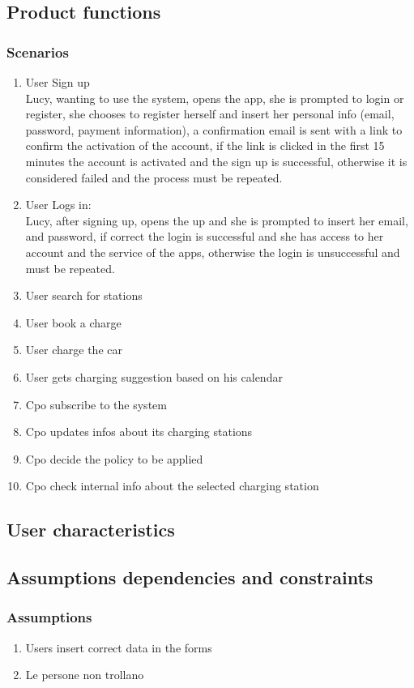\subsection{Product functions}

\subsubsection{Scenarios}
\begin{enumerate}[label=S\arabic*]
    \item User Sign up\\
          Lucy, wanting to use the system, opens the app, she is prompted to login or register, she chooses to register herself and insert her personal info (email, password, payment information), a confirmation email is sent with a link to confirm the activation of the account, if the link is clicked in the first 15 minutes the account is activated and the sign up is successful, otherwise it is considered failed and the process must be repeated.
    \item User Logs in:\\
          Lucy, after signing up, opens the up and she is prompted to insert her email, and password, if correct the login is successful and she has access to her account and the service of the apps, otherwise the login is unsuccessful and must be repeated.
    \item User search for stations
    \item User book a charge
    \item User charge the car
    \item User gets charging suggestion based on his calendar
    \item Cpo subscribe to the system
    \item Cpo updates infos about its charging stations
    \item Cpo decide the policy to be applied
    \item Cpo check internal info about the selected charging station
\end{enumerate}
\subsection{User characteristics}

\subsection{Assumptions dependencies and constraints}
\subsubsection{Assumptions}
\begin{enumerate}[label=A\arabic*]
    \item Users insert correct data in the forms
    \item Le persone non trollano
\end{enumerate}
\clearpage